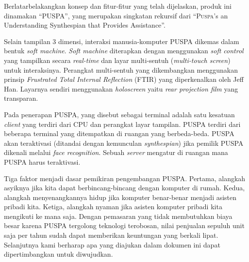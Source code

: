 Berlatarbelakangkan konsep dan fitur-fitur yang telah dijelaskan, produk ini dinamakan ``PUSPA'', yang merupakan singkatan rekursif dari ``{\scshape Puspa}'s an Understanding Synthespian that Provides Assistance''.

Selain tampilan 3 dimensi, interaksi manusia-komputer PUSPA dikemas dalam bentuk \textit{soft machine}. \textit{Soft machine} diterapkan dengan menggunakan \textit{soft control} yang tampilkan secara \textit{real-time} dan layar multi-sentuh (\textit{multi-touch screen}) untuk interaksinya. Perangkat multi-sentuh yang dikembangkan menggunakan prinsip \textit{Frustrated Total Internal Reflection} (FTIR) yang diperkenalkan oleh Jeff Han. Layarnya sendiri menggunakan \textit{holoscreen} yaitu \textit{rear projection film} yang transparan.

Pada penerapan PUSPA, yang disebut sebagai terminal adalah satu kesatuan \textit{client} yang terdiri dari CPU dan perangkat layar tampilan. PUSPA terdiri dari beberapa terminal yang ditempatkan di ruangan yang berbeda-beda. PUSPA akan teraktivasi (ditandai dengan kemunculan \textit{synthespian}) jika pemilik PUSPA dikenali melalui \textit{face recognition}. Sebuah \textit{server} mengatur di ruangan mana PUSPA harus teraktivasi.

Tiga faktor menjadi dasar pemikiran pengembangan PUSPA. Pertama, alangkah asyiknya jika kita dapat berbincang-bincang dengan komputer di rumah. Kedua, alangkah menyenangkannya hidup jika komputer benar-benar menjadi asisten pribadi kita. Ketiga, alangkah nyaman jika asisten komputer pribadi kita mengikuti ke mana saja. Dengan pemasaran yang tidak membutuhkan biaya besar karena PUSPA tergolong teknologi terobosan, nilai penjualan sepuluh unit saja per tahun sudah dapat memberikan keuntungan yang berkali lipat. Selanjutnya kami berharap apa yang diajukan dalam dokumen ini dapat dipertimbangkan untuk diwujudkan.
